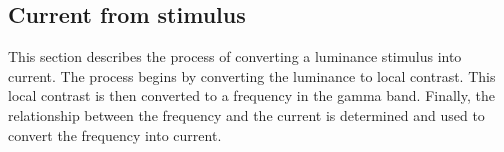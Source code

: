 \subsection{Current from stimulus}

This section describes the process of converting a luminance stimulus into current. The process begins by converting the luminance to local contrast. This local contrast is then converted to a frequency in the gamma band. Finally, the relationship between the frequency and the current is determined and used to convert the frequency into current.




